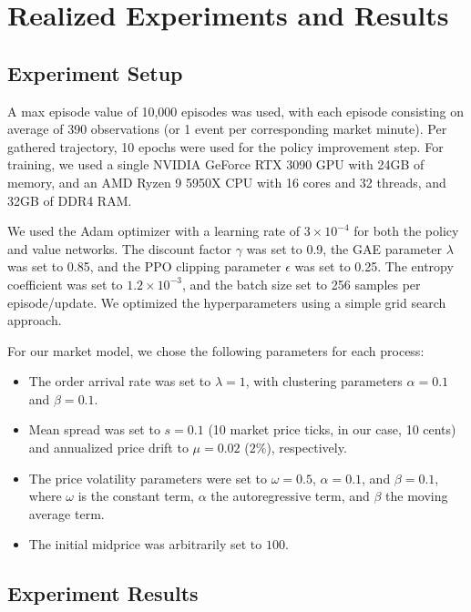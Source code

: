 \section{Realized Experiments and Results}
\label{sec:realized-experiments-and-results}

\subsection{Experiment Setup}
\label{subsec:experiment-setup}

A max episode value of 10,000 episodes was used, with each episode consisting on average of 390 observations (or 1 event per corresponding market minute).
Per gathered trajectory, 10 epochs were used for the policy improvement step.
For training, we used a single NVIDIA GeForce RTX 3090 GPU with 24GB of memory, and an AMD Ryzen 9 5950X CPU with 16 cores and 32 threads,
and 32GB of DDR4 RAM.

We used the Adam optimizer with a learning rate of $3 \times 10^{-4}$ for both the policy and value networks.
The discount factor $\gamma$ was set to 0.9, the GAE parameter $\lambda$ was set to 0.85, and the PPO clipping parameter $\epsilon$ was set to 0.25.
The entropy coefficient was set to $1.2\times10^{-3}$, and the batch size set to 256 samples per episode/update.
We optimized the hyperparameters using a simple grid search approach.

For our market model, we chose the following parameters for each process:
\begin{itemize}
    \item The order arrival rate was set to $\lambda = 1$, with clustering parameters $\alpha = 0.1$ and $\beta = 0.1$.
    \item Mean spread was set to $s = 0.1$ (10 market price ticks, in our case, 10 cents) and annualized price drift to $\mu = 0.02$ ($2\%$), respectively.
    \item The price volatility parameters were set to $\omega = 0.5$, $\alpha = 0.1$, and $\beta = 0.1$,
    where $\omega$ is the constant term, $\alpha$ the autoregressive term, and $\beta$ the moving average term.
    \item The initial midprice was arbitrarily set to $100$.
\end{itemize}

\subsection{Experiment Results}
\label{subsec:experiment-results}

